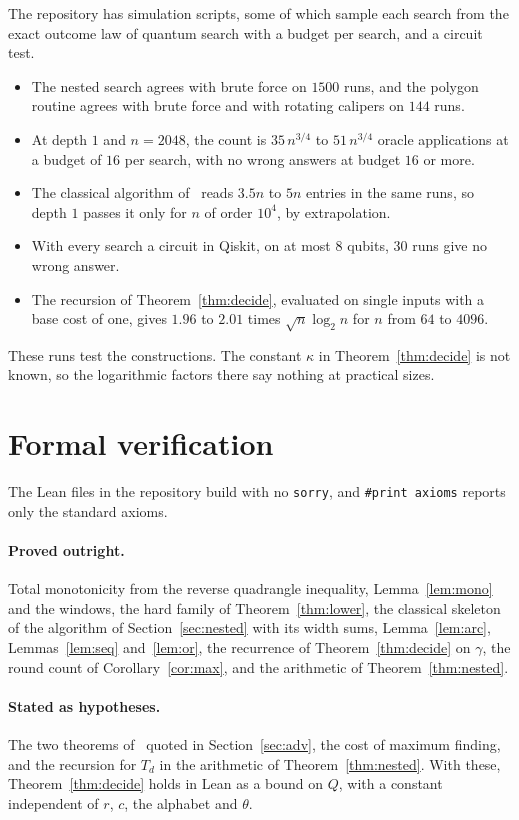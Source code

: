 \documentclass[11pt]{article}
\theoremstyle{definition}
\theoremstyle{remark}
\begin{document}
The repository has simulation scripts, some of which sample each search from the exact outcome law of quantum search with a budget per search, and a circuit test.
\begin{itemize}[leftmargin=1.5em]
\item The nested search agrees with brute force on $1500$ runs, and the polygon routine agrees with brute force and with rotating calipers on $144$ runs.
\item At depth $1$ and $n=2048$, the count is $35\,n^{3/4}$ to $51\,n^{3/4}$ oracle applications at a budget of $16$ per search, with no wrong answers at budget $16$ or more.
\item The classical algorithm of~\cite{AKMSW87} reads $3.5n$ to $5n$ entries in the same runs, so depth $1$ passes it only for $n$ of order $10^4$, by extrapolation.
\item With every search a circuit in Qiskit, on at most $8$ qubits, $30$ runs give no wrong answer.
\item The recursion of Theorem~\ref{thm:decide}, evaluated on single inputs with a base cost of one, gives $1.96$ to $2.01$ times $\sqrt n\log_2 n$ for $n$ from $64$ to $4096$.
\end{itemize}
These runs test the constructions. The constant $\kappa$ in Theorem~\ref{thm:decide} is not known, so the logarithmic factors there say nothing at practical sizes.

\section{Formal verification}\label{sec:lean}

The Lean files in the repository build with no \texttt{sorry}, and \texttt{\#print axioms} reports only the standard axioms.

\paragraph{Proved outright.} Total monotonicity from the reverse quadrangle inequality, Lemma~\ref{lem:mono} and the windows, the hard family of Theorem~\ref{thm:lower}, the classical skeleton of the algorithm of Section~\ref{sec:nested} with its width sums, Lemma~\ref{lem:arc}, Lemmas~\ref{lem:seq} and~\ref{lem:or}, the recurrence of Theorem~\ref{thm:decide} on $\gamma$, the round count of Corollary~\ref{cor:max}, and the arithmetic of Theorem~\ref{thm:nested}.

\paragraph{Stated as hypotheses.} The two theorems of~\cite{LMRSS11} quoted in Section~\ref{sec:adv}, the cost of maximum finding, and the recursion for $T_d$ in the arithmetic of Theorem~\ref{thm:nested}. With these, Theorem~\ref{thm:decide} holds in Lean as a bound on $Q$, with a constant independent of $r$, $c$, the alphabet and $\theta$.
\end{document}
